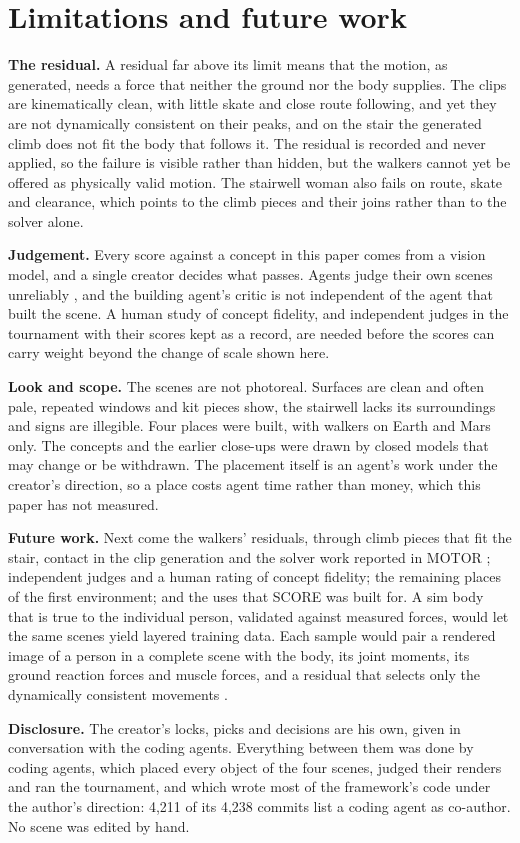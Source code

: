 \section{Limitations and future work}\label{limitations-and-future-work}

\textbf{The residual.} A residual far above its limit means that the motion, as generated, needs a force that neither the ground nor the body supplies. The clips are kinematically clean, with little skate and close route following, and yet they are not dynamically consistent on their peaks, and on the stair the generated climb does not fit the body that follows it. The residual is recorded and never applied, so the failure is visible rather than hidden, but the walkers cannot yet be offered as physically valid motion. The stairwell woman also fails on route, skate and clearance, which points to the climb pieces and their joins rather than to the solver alone.

\textbf{Judgement.} Every score against a concept in this paper comes from a vision model, and a single creator decides what passes. Agents judge their own scenes unreliably \citep{li2026lego}, and the building agent's critic is not independent of the agent that built the scene. A human study of concept fidelity, and independent judges in the tournament with their scores kept as a record, are needed before the scores can carry weight beyond the change of scale shown here.

\textbf{Look and scope.} The scenes are not photoreal. Surfaces are clean and often pale, repeated windows and kit pieces show, the stairwell lacks its surroundings and signs are illegible. Four places were built, with walkers on Earth and Mars only. The concepts and the earlier close-ups were drawn by closed models that may change or be withdrawn. The placement itself is an agent's work under the creator's direction, so a place costs agent time rather than money, which this paper has not measured.

\textbf{Future work.} Next come the walkers' residuals, through climb pieces that fit the stair, contact in the clip generation and the solver work reported in MOTOR \citep{motor}; independent judges and a human rating of concept fidelity; the remaining places of the first environment; and the uses that SCORE was built for. A sim body that is true to the individual person, validated against measured forces, would let the same scenes yield layered training data. Each sample would pair a rendered image of a person in a complete scene with the body, its joint moments, its ground reaction forces and muscle forces, and a residual that selects only the dynamically consistent movements \citep{delp2007opensim, werling2023addbiomechanics, huo2026biohuman}.

\textbf{Disclosure.} The creator's locks, picks and decisions are his own, given in conversation with the coding agents. Everything between them was done by coding agents, which placed every object of the four scenes, judged their renders and ran the tournament, and which wrote most of the framework's code under the author's direction: 4,211 of its 4,238 commits list a coding agent as co-author. No scene was edited by hand.
